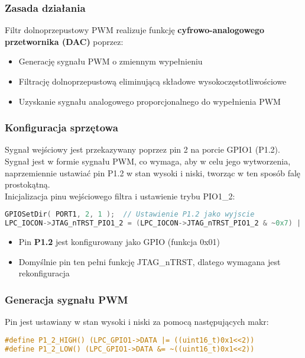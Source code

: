 \documentclass[a4paper,12pt]{report}
\begin{document}
\subsubsection{Zasada działania}

Filtr dolnoprzepustowy PWM realizuje funkcję \textbf{cyfrowo-analogowego przetwornika (DAC)} poprzez:
\begin{itemize}
    \item Generację sygnału PWM o zmiennym wypełnieniu
    \item Filtrację dolnoprzepustową eliminującą składowe wysokoczęstotliwościowe
    \item Uzyskanie sygnału analogowego proporcjonalnego do wypełnienia PWM
\end{itemize}

\subsubsection{Konfiguracja sprzętowa}

Sygnał wejściowy jest przekazywany poprzez pin 2 na porcie GPIO1 (P1.2). Sygnał jest w formie sygnału PWM, co wymaga, aby w celu jego wytworzenia, naprzemiennie ustawiać pin P1.2 w stan wysoki i niski, tworząc w ten sposób falę prostokątną.\\

Inicjalizacja pinu wejściowego filtra i ustawienie trybu PIO1\_2:
\begin{lstlisting}[language=C]
GPIOSetDir( PORT1, 2, 1 );  // Ustawienie P1.2 jako wyjscie
LPC_IOCON->JTAG_nTRST_PIO1_2 = (LPC_IOCON->JTAG_nTRST_PIO1_2 & ~0x7) | 0x01;
\end{lstlisting}

\begin{itemize}
    \item Pin \textbf{P1.2} jest konfigurowany jako GPIO (funkcja 0x01)
    \item Domyślnie pin ten pełni funkcję JTAG\_nTRST, dlatego wymagana jest rekonfiguracja
\end{itemize}

\subsubsection{Generacja sygnału PWM}

\indent \indent Pin jest ustawiany w stan wysoki i niski za pomocą następujących makr:
\begin{lstlisting}[language=C]
#define P1_2_HIGH() (LPC_GPIO1->DATA |= ((uint16_t)0x1<<2))
#define P1_2_LOW() (LPC_GPIO1->DATA &= ~((uint16_t)0x1<<2))
\end{lstlisting}
\end{document}

